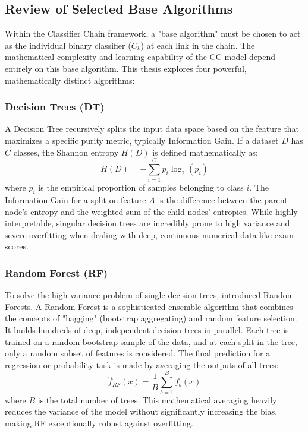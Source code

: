 \subsection{Review of Selected Base Algorithms}

Within the Classifier Chain \parencite{read2011classifier} framework, a "base algorithm" must be chosen to act as the individual binary classifier ($C_k$) at each link in the chain. The mathematical complexity and learning capability of the CC model depend entirely on this base algorithm. This thesis explores four powerful, mathematically distinct algorithms:

\subsubsection{Decision Trees (DT)}
A Decision Tree recursively splits the input data space based on the feature that maximizes a specific purity metric, typically Information Gain. If a dataset $D$ has $C$ classes, the Shannon entropy $H(D)$ is defined mathematically as:
\[
H(D) = - \sum_{i=1}^{C} p_i \log_2(p_i)
\]
where $p_i$ is the empirical proportion of samples belonging to class $i$. The Information Gain for a split on feature $A$ is the difference between the parent node's entropy and the weighted sum of the child nodes' entropies. While highly interpretable, singular decision trees are incredibly prone to high variance and severe overfitting when dealing with deep, continuous numerical data like exam scores.

\subsubsection{Random Forest (RF)}
To solve the high variance problem of single decision trees, \textcite{breiman2001random} introduced Random Forests. A Random Forest \parencite{breiman2001random} is a sophisticated ensemble algorithm that combines the concepts of "bagging" (bootstrap aggregating) and random feature selection. It builds hundreds of deep, independent decision trees in parallel. Each tree is trained on a random bootstrap sample of the data, and at each split in the tree, only a random subset of features is considered. The final prediction for a regression or probability task is made by averaging the outputs of all trees:
\[
\hat{f}_{RF}(x) = \frac{1}{B} \sum_{b=1}^{B} f_b(x)
\]
where $B$ is the total number of trees. This mathematical averaging heavily reduces the variance of the model without significantly increasing the bias, making RF exceptionally robust against overfitting.

